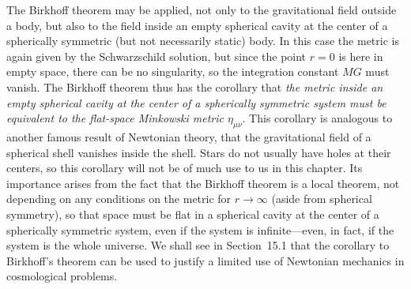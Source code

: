 The Birkhoff theorem may be applied, not only to the gravitational field
outside a body, but also to the field inside an empty spherical cavity at the
center of a spherically symmetric (but not necessarily static) body. In this
case the metric is again given by the Schwarzschild solution, but since the
point \(r=0\) is here in empty space, there can be no singularity, so the
integration constant \(MG\) must vanish. The Birkhoff theorem thus has the
corollary that \emph{the metric inside an empty spherical cavity at the center
of a spherically symmetric system must be equivalent to the flat-space
Minkowski metric \(\eta_{\mu\nu}\)}. This corollary is analogous to another
famous result of Newtonian theory, that the gravitational field of a spherical
shell vanishes inside the shell. Stars do not usually have holes at their
centers, so this corollary will not be of much use to us in this chapter. Its
importance arises from the fact that the Birkhoff theorem is a local theorem,
not depending on any conditions on the metric for \(r\to\infty\) (aside from
spherical symmetry), so that space must be flat in a spherical cavity at the
center of a spherically symmetric system, even if the system is
infinite---even, in fact, if the system is the whole universe. We shall see
in Section~15.1 that the corollary to Birkhoff's theorem can be used to justify
a limited use of Newtonian mechanics in cosmological problems.

